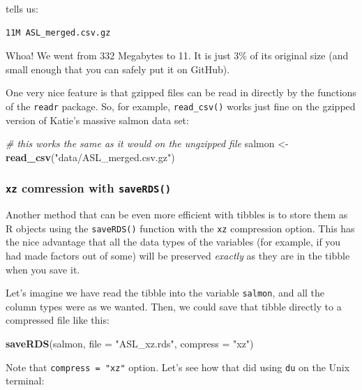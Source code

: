\documentclass[]{book}
\newenvironment{Shaded}{\begin{snugshade}}{\end{snugshade}}
\newcommand{\KeywordTok}[1]{\textcolor[rgb]{0.13,0.29,0.53}{\textbf{{#1}}}}
\newcommand{\DataTypeTok}[1]{\textcolor[rgb]{0.13,0.29,0.53}{{#1}}}
\newcommand{\StringTok}[1]{\textcolor[rgb]{0.31,0.60,0.02}{{#1}}}
\newcommand{\CommentTok}[1]{\textcolor[rgb]{0.56,0.35,0.01}{\textit{{#1}}}}
\newcommand{\NormalTok}[1]{{#1}}
\theoremstyle{definition}
\theoremstyle{definition}
\theoremstyle{remark}
\begin{document}
tells us:

\begin{verbatim}
11M ASL_merged.csv.gz
\end{verbatim}

Whoa! We went from 332 Megabytes to 11. It is just 3\% of its original
size (and small enough that you can safely put it on GitHub).

One very nice feature is that gzipped files can be read in directly by
the functions of the \texttt{readr} package. So, for example,
\texttt{read\_csv()} works just fine on the gzipped version of Katie's
massive salmon data set:

\begin{Shaded}
\begin{Highlighting}[]
\CommentTok{# this works the same as it would on the ungzipped file}
\NormalTok{salmon <-}\StringTok{ }\KeywordTok{read_csv}\NormalTok{(}\StringTok{"data/ASL_merged.csv.gz"}\NormalTok{)}
\end{Highlighting}
\end{Shaded}

\subsubsection{\texorpdfstring{\texttt{xz} comression with
\texttt{saveRDS()}}{xz comression with saveRDS()}}\label{xz-comression-with-saverds}

Another method that can be even more efficient with tibbles is to store
them as R objects using the \texttt{saveRDS()} function with the
\texttt{xz} compression option. This has the nice advantage that all the
data types of the variables (for example, if you had made factors out of
some) will be preserved \emph{exactly} as they are in the tibble when
you save it.

Let's imagine we have read the tibble into the variable \texttt{salmon},
and all the column types were as we wanted. Then, we could save that
tibble directly to a compressed file like this:

\begin{Shaded}
\begin{Highlighting}[]
\KeywordTok{saveRDS}\NormalTok{(salmon, }\DataTypeTok{file =} \StringTok{"ASL_xz.rds"}\NormalTok{, }\DataTypeTok{compress =} \StringTok{"xz"}\NormalTok{)}
\end{Highlighting}
\end{Shaded}

Note that \texttt{compress\ =\ "xz"} option. Let's see how that did
using \texttt{du} on the Unix terminal:
\end{document}

